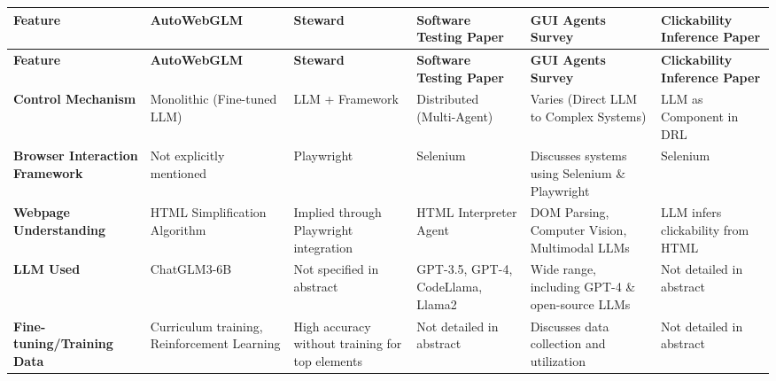 \documentclass[conference]{IEEEtran}
\begin{document}
\onecolumn
\begin{longtable}{|>{\raggedright\arraybackslash}p{2.5cm}|>{\raggedright\arraybackslash}p{2.5cm}|>{\raggedright\arraybackslash}p{2.5cm}|>{\raggedright\arraybackslash}p{2.5cm}|>{\raggedright\arraybackslash}p{2.5cm}|>{\raggedright\arraybackslash}p{2.5cm}|}
    \hline
    \textbf{Feature}                       & \textbf{AutoWebGLM}                         & \textbf{Steward}                                & \textbf{Software Testing Paper}   & \textbf{GUI Agents Survey}                      & \textbf{Clickability Inference Paper} \\
    \hline
    \endfirsthead

    \hline
    \textbf{Feature}                       & \textbf{AutoWebGLM}                         & \textbf{Steward}                                & \textbf{Software Testing Paper}   & \textbf{GUI Agents Survey}                      & \textbf{Clickability Inference Paper} \\
    \hline
    \endhead

    \hline
    \endfoot

    \hline
    \endlastfoot

    \textbf{Control Mechanism}             & Monolithic (Fine-tuned LLM)                 & LLM + Framework                                 & Distributed (Multi-Agent)         & Varies (Direct LLM to Complex Systems)          & LLM as Component in DRL               \\
    \hline
    \textbf{Browser Interaction Framework} & Not explicitly mentioned                    & Playwright                                      & Selenium                          & Discusses systems using Selenium \& Playwright  & Selenium                              \\
    \hline
    \textbf{Webpage Understanding}         & HTML Simplification Algorithm               & Implied through Playwright integration          & HTML Interpreter Agent            & DOM Parsing, Computer Vision, Multimodal LLMs   & LLM infers clickability from HTML     \\
    \hline
    \textbf{LLM Used}                      & ChatGLM3-6B                                 & Not specified in abstract                       & GPT-3.5, GPT-4, CodeLlama, Llama2 & Wide range, including GPT-4 \& open-source LLMs & Not detailed in abstract              \\
    \hline
    \textbf{Fine-tuning/Training Data}     & Curriculum training, Reinforcement Learning & High accuracy without training for top elements & Not detailed in abstract          & Discusses data collection and utilization       & Not detailed in abstract              \\
    \hline
\end{longtable}
\twocolumn
\end{document}
